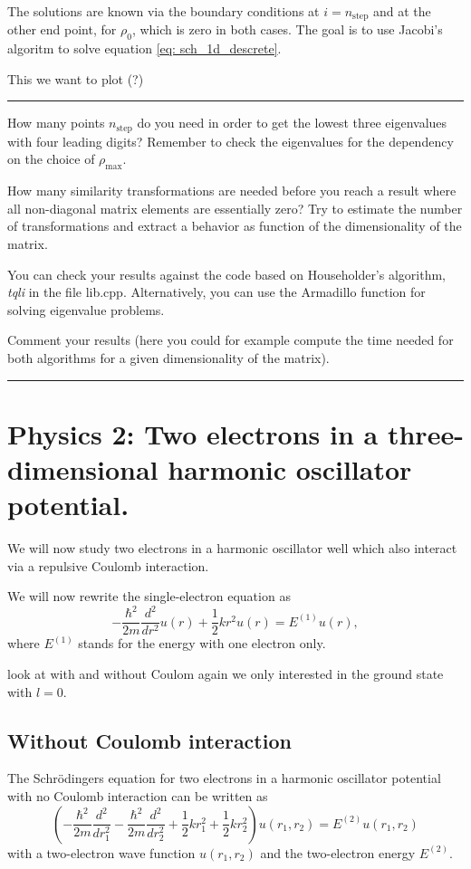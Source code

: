 \documentclass[11pt,a4wide]{article}
\begin{document}
The solutions are known via the boundary conditions at $i=n_{\mathrm{step}}$ and at the other end point, for  $\rho_0$, which is zero in both cases. The goal is to use Jacobi's algoritm to solve equation \ref{eq: sch_1d_descrete}.

This we want to plot (?)

\noindent\rule{\textwidth}{1pt}
How many points $n_{\mathrm{step}}$
do you need in order to get the lowest three eigenvalues 
with four leading digits?  
Remember to check the eigenvalues for 
the dependency on the choice of $\rho_{\mathrm{max}}$.

How many similarity transformations are needed before you reach a 
result where all non-diagonal matrix elements are essentially zero?
Try to estimate the number of transformations and extract a behavior as function
of the dimensionality of the matrix.

You can check your results against the code based
on Householder's algorithm, {\em tqli} in the file lib.cpp. Alternatively, you can use the Armadillo function for solving 
eigenvalue problems. 

Comment your results (here you could for example compute the time needed for 
both algorithms for a given dimensionality of the matrix).  

\noindent\rule{\textwidth}{1pt}

\section{Physics 2: Two electrons in a three-dimensional harmonic oscillator potential.}
We will now study two electrons in a harmonic oscillator well which also interact via a repulsive Coulomb interaction.


We will now rewrite the single-electron equation as
\[
  -\frac{\hbar^2}{2 m} \frac{d^2}{dr^2} u(r) 
       + \frac{1}{2}k r^2u(r)  = E^{(1)} u(r),
\]
where $E^{(1)}$ stands for the energy with one electron only.

look at with and without Coulom
again we only interested in the ground state with $l=0$. 


\subsection{Without Coulomb interaction}
The Schr\"odingers equation for two electrons in a harmonic oscillator potential with no Coulomb interaction can be written as
\begin{equation}
\left(  -\frac{\hbar^2}{2 m} \frac{d^2}{dr_1^2} -\frac{\hbar^2}{2 m} \frac{d^2}{dr_2^2}+ \frac{1}{2}k r_1^2+ \frac{1}{2}k r_2^2\right)u(r_1,r_2)  = E^{(2)} u(r_1,r_2) 
\label{eq: sch_2d_uC}
\end{equation}
with a two-electron wave function $u(r_1,r_2)$ and the two-electron energy $E^{(2)}$.
\end{document}
